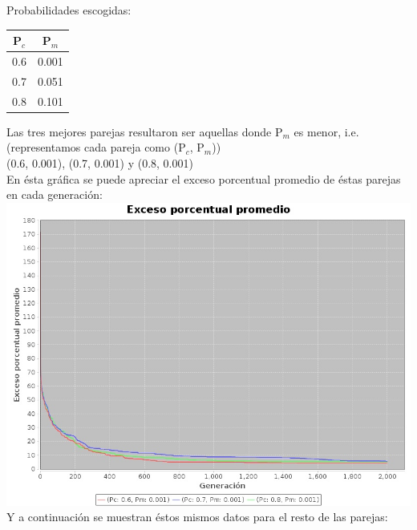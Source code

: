 \documentclass[12pt]{article}
\begin{document}
\noindent Probabilidades escogidas: \\

\begin{center}
    \begin{tabular}{c | c}
      P$_c$ & P$_m$  \\ \hline
      0.6 & 0.001  \\ \hline
      0.7 & 0.051  \\ \hline
      0.8 & 0.101  \\ 
    \end{tabular}
\end{center}

\noindent Las tres mejores parejas resultaron ser aquellas donde P$_m$ es menor, i.e.
(representamos cada pareja como (P$_c$, P$_m$)) \\
(0.6, 0.001), (0.7, 0.001) y (0.8, 0.001) \\

\noindent En ésta gráfica se puede apreciar el exceso porcentual promedio de éstas  parejas
en cada generación: \\

\includegraphics[width=\textwidth]{datos.jpeg} \\

\noindent Y a continuación se muestran éstos mismos datos para el resto de las parejas: \\
\end{document}
